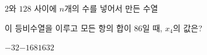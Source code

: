 $2$와 $128$ 사이에 $n$개의 수를 넣어서 만든 수열 \par\smallskip{}\par\smallskip\noindent 이 등비수열을 이루고 모든 항의 합이 $86$일 때, $x_4$의 값은?
\begin{choices32}{$-32$}{$-16$}{$8$}{$16$}{$32$}\end{choices32}

